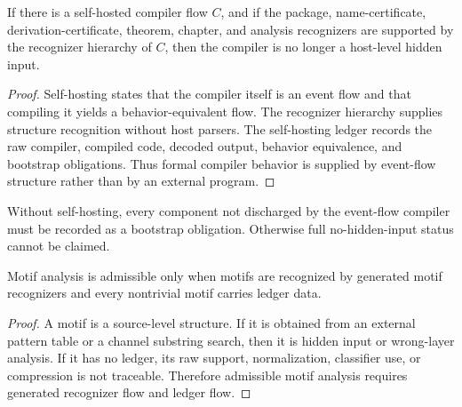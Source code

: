 \begin{theorem}
\label{thm:main-theorems-self-hosting-removes-hidden-compiler}
If there is a self-hosted compiler flow $C$, and if the package, name-certificate, derivation-certificate, theorem, chapter, and analysis recognizers are supported by the recognizer hierarchy of $C$, then the compiler is no longer a host-level hidden input.
\end{theorem}

\begin{proof}
Self-hosting states that the compiler itself is an event flow and that compiling it yields a behavior-equivalent flow. The recognizer hierarchy supplies structure recognition without host parsers. The self-hosting ledger records the raw compiler, compiled code, decoded output, behavior equivalence, and bootstrap obligations. Thus formal compiler behavior is supplied by event-flow structure rather than by an external program.
\end{proof}

\begin{corollary}
\label{cor:main-theorems-declared-bootstrap-boundary}
Without self-hosting, every component not discharged by the event-flow compiler must be recorded as a bootstrap obligation. Otherwise full no-hidden-input status cannot be claimed.
\end{corollary}

\begin{theorem}
\label{thm:main-theorems-motif-analysis}
Motif analysis is admissible only when motifs are recognized by generated motif recognizers and every nontrivial motif carries ledger data.
\end{theorem}

\begin{proof}
A motif is a source-level structure. If it is obtained from an external pattern table or a channel substring search, then it is hidden input or wrong-layer analysis. If it has no ledger, its raw support, normalization, classifier use, or compression is not traceable. Therefore admissible motif analysis requires generated recognizer flow and ledger flow.
\end{proof}

